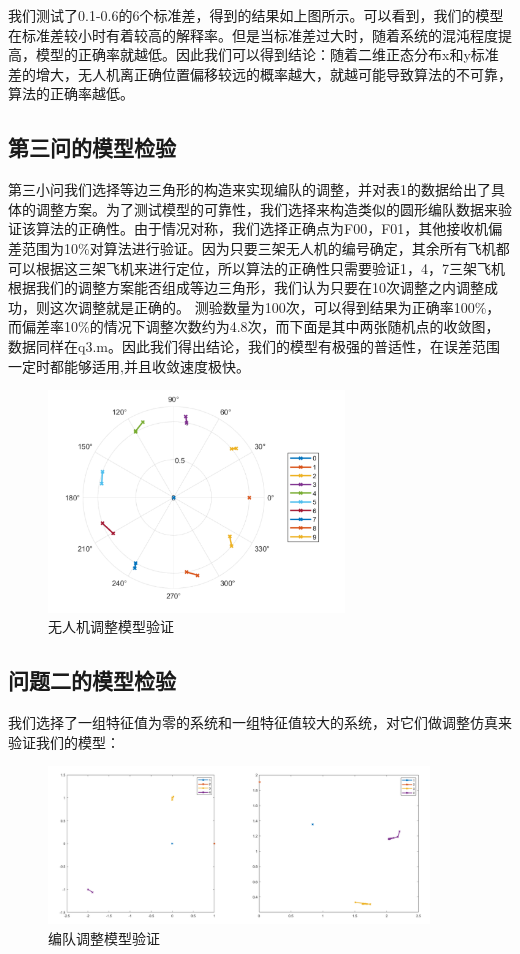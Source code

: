 \documentclass{my_paper}
\begin{document}
我们测试了0.1-0.6的6个标准差，得到的结果如上图所示。可以看到，我们的模型在标准差较小时有着较高的解释率。但是当标准差过大时，随着系统的混沌程度提高，模型的正确率就越低。因此我们可以得到结论：随着二维正态分布x和y标准差的增大，无人机离正确位置偏移较远的概率越大，就越可能导致算法的不可靠，算法的正确率越低。

\subsection{第三问的模型检验}
第三小问我们选择等边三角形的构造来实现编队的调整，并对表1的数据给出了具体的调整方案。为了测试模型的可靠性，我们选择来构造类似的圆形编队数据来验证该算法的正确性。由于情况对称，我们选择正确点为F00，F01，其他接收机偏差范围为10\%对算法进行验证。因为只要三架无人机的编号确定，其余所有飞机都可以根据这三架飞机来进行定位，所以算法的正确性只需要验证1，4，7三架飞机根据我们的调整方案能否组成等边三角形，我们认为只要在10次调整之内调整成功，则这次调整就是正确的。
测验数量为100次，可以得到结果为正确率100\%，而偏差率10\%的情况下调整次数约为4.8次，而下面是其中两张随机点的收敛图，数据同样在q3.m。因此我们得出结论，我们的模型有极强的普适性，在误差范围一定时都能够适用,并且收敛速度极快。

\begin{figure}[H]
    \centering
    \includegraphics[width=0.7\textwidth]{check3}
    \caption{无人机调整模型验证} 
\end{figure}

\subsection{问题二的模型检验}

我们选择了一组特征值为零的系统和一组特征值较大的系统，对它们做调整仿真来验证我们的模型：

\begin{figure}[H]
    \centering
    \includegraphics[width=0.9\textwidth]{check4}
    \caption{编队调整模型验证} 
\end{figure}
\end{document}
